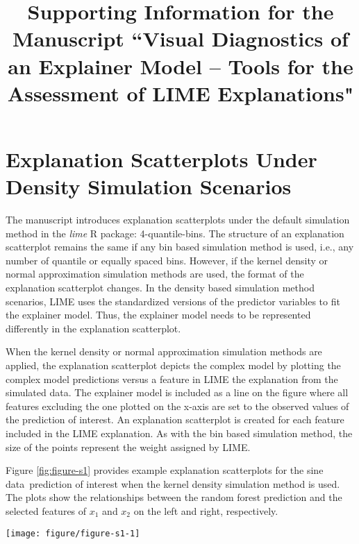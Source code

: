 \documentclass{article}\usepackage[]{graphicx}\usepackage[]{color}
\title{Supporting Information for the Manuscript ``Visual Diagnostics of an Explainer Model -- Tools for the Assessment of LIME Explanations"}
\date{}
\newenvironment{knitrout}{}{} %
\newcommand{\data}{sine data}
\begin{document}
\maketitle
\tableofcontents



\section{Explanation Scatterplots Under Density Simulation Scenarios}

The manuscript introduces explanation scatterplots under the default simulation method in the \emph{lime} R package: 4-quantile-bins. The structure of an explanation scatterplot remains the same if any bin based simulation method is used, i.e., any number of quantile or equally spaced bins. However, if the kernel density or normal approximation simulation methods are used, the format of the explanation scatterplot changes. In the density based simulation method scenarios, LIME uses the standardized versions of the predictor variables to fit the explainer model. Thus, the explainer model needs to be represented differently in the explanation scatterplot.

When the kernel density or normal approximation simulation methods are applied, the explanation scatterplot depicts the complex model by plotting the complex model predictions versus a feature in LIME the explanation from the simulated data. The explainer model is included as a line on the figure where all features excluding the one plotted on the x-axis are set to the observed values of the prediction of interest. An explanation scatterplot is created for each feature included in the LIME explanation. As with the bin based simulation method, the size of the points represent the weight assigned by LIME.

Figure \ref{fig:figure-s1} provides example explanation scatterplots for the \data \ prediction of interest when the kernel density simulation method is used. The plots show the relationships between the random forest prediction and the selected features of $x_1$ and $x_2$ on the left and right, respectively.  

\vspace{0.5cm}

\renewcommand{\thefigure}{S1}
\begin{figure*}[!thp]
\begin{knitrout}
\color{fgcolor}

{\centering \texttt{[image: figure/figure-s1-1]} 

}



\end{knitrout}
\caption{Explanation scatterplots for the \data \ prediction of interest with the kernel density simulation method.}
\label{fig:figure-s1}
\end{figure*}
\end{document}
